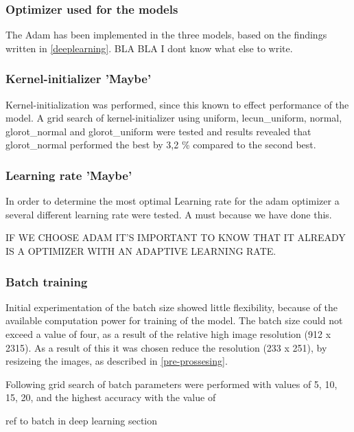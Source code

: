 \subsubsection{Optimizer used for the models}
The Adam has been implemented in the three models, based on the findings written in \autoref{deeplearning}. 
BLA BLA I dont know what else to write.  

\subsubsection{Kernel-initializer 'Maybe'}
Kernel-initialization was performed, since this known to effect performance of the model. 
A grid search of kernel-initializer using uniform, lecun_uniform, normal, glorot_normal and glorot_uniform were tested and results revealed that glorot_normal performed the best by 3,2 \% compared to the second best. 


\subsubsection{Learning rate 'Maybe'}
In order to determine the most optimal Learning rate for the adam optimizer a several different learning rate were tested. 
A must because we have done this. 

IF WE CHOOSE ADAM IT'S IMPORTANT TO KNOW THAT IT ALREADY IS A OPTIMIZER WITH AN ADAPTIVE LEARNING RATE. 


\subsubsection{Batch training}
Initial experimentation of the batch size showed little flexibility, because of the available computation power for training of the model. The batch size could not exceed a value of four, as a result of the relative high image resolution (912 x 2315). As a result of this it was chosen reduce the resolution (233 x 251), by resizeing the images, as described in \ref{pre-prossesing}. 

Following grid search of batch parameters were performed with values of 5, 10, 15, 20, and the highest accuracy with the value of

ref to batch in deep learning section

 

 
 
